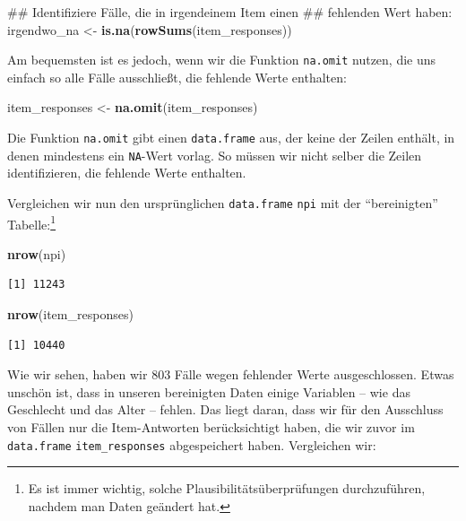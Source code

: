 \documentclass[12pt,]{tufte-book}
\newenvironment{Shaded}{\begin{snugshade}}{\end{snugshade}}
\newcommand{\KeywordTok}[1]{\textcolor[rgb]{0.13,0.29,0.53}{\textbf{#1}}}
\newcommand{\StringTok}[1]{\textcolor[rgb]{0.31,0.60,0.02}{#1}}
\newcommand{\NormalTok}[1]{#1}
\theoremstyle{definition}
\theoremstyle{definition}
\theoremstyle{definition}
\theoremstyle{remark}
\begin{document}
\begin{Shaded}
\begin{Highlighting}[]
\NormalTok{## Identifiziere Fälle, die in irgendeinem Item einen}
\NormalTok{## fehlenden Wert haben:}
\NormalTok{irgendwo_na <-}\StringTok{ }\KeywordTok{is.na}\NormalTok{(}\KeywordTok{rowSums}\NormalTok{(item_responses))}
\end{Highlighting}
\end{Shaded}

Am bequemsten ist es jedoch, wenn wir die Funktion \texttt{na.omit}
nutzen, die uns einfach so alle Fälle ausschließt, die fehlende Werte
enthalten:

\begin{Shaded}
\begin{Highlighting}[]
\NormalTok{item_responses <-}\StringTok{ }\KeywordTok{na.omit}\NormalTok{(item_responses)}
\end{Highlighting}
\end{Shaded}

Die Funktion \texttt{na.omit} gibt einen \texttt{data.frame} aus, der
keine der Zeilen enthält, in denen mindestens ein \texttt{NA}-Wert
vorlag. So müssen wir nicht selber die Zeilen identifizieren, die
fehlende Werte enthalten.

Vergleichen wir nun den ursprünglichen \texttt{data.frame} \texttt{npi}
mit der ``bereinigten'' Tabelle:\footnote{Es ist immer wichtig, solche
  Plausibilitätsüberprüfungen durchzuführen, nachdem man Daten geändert
  hat.}

\begin{Shaded}
\begin{Highlighting}[]
\KeywordTok{nrow}\NormalTok{(npi)}
\end{Highlighting}
\end{Shaded}

\begin{verbatim}
[1] 11243
\end{verbatim}

\begin{Shaded}
\begin{Highlighting}[]
\KeywordTok{nrow}\NormalTok{(item_responses)}
\end{Highlighting}
\end{Shaded}

\begin{verbatim}
[1] 10440
\end{verbatim}

Wie wir sehen, haben wir 803 Fälle wegen fehlender Werte ausgeschlossen.
Etwas unschön ist, dass in unseren bereinigten Daten einige Variablen --
wie das Geschlecht und das Alter -- fehlen. Das liegt daran, dass wir
für den Ausschluss von Fällen nur die Item-Antworten berücksichtigt
haben, die wir zuvor im \texttt{data.frame} \texttt{item\_responses}
abgespeichert haben. Vergleichen wir:
\end{document}
